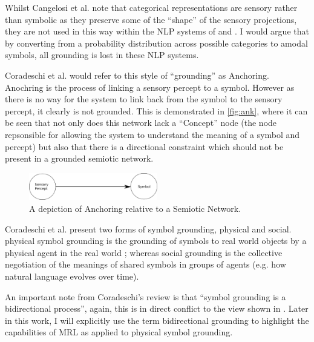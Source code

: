 Whilst Cangelosi et al. note that categorical representations are sensory rather than symbolic as they preserve some of the ``shape'' of the sensory projections, they are not used in this way within the \ac{NLP} systems of \cite{lemonlearning} and \cite{yu2017learning}. I would argue that by converting from a probability distribution across possible categories to amodal symbols, all grounding is lost in these \ac{NLP} systems.

Coradeschi et al. \cite{coradeschi2000anchoring, coradeschi2003introduction} would refer to this style of ``grounding'' as Anchoring. Anochring is the process of linking a sensory percept to a symbol. However as there is no way for the system to link back from the symbol to the sensory percept, it clearly is not grounded. This is demonstrated in \autoref{fig:ank}, where it can be seen that not only does this network lack a ``Concept'' node (the node repsonsible for allowing the system to understand the meaning of a symbol and percept) but also that there is a directional constraint which should not be present in a grounded semiotic network. 

\begin{figure}
\centering
\includegraphics[width=0.5\textwidth]{Figs/litReview/anchoring.png}
\caption{A depiction of Anchoring relative to a Semiotic Network.}
\label{fig:ank}

\end{figure}


Coradeschi et al. \cite{coradeschi2013short} present two forms of symbol grounding, physical and social. physical symbol grounding is the grounding of symbols to real world objects by a physical agent in the real world \cite{vogt2002physical}; whereas social grounding is the collective negotiation of the meanings of shared symbols in groups of agents \cite{cangelosi2006grounding} (e.g. how natural language evolves over time).

An important note from Coradeschi's review is that ``symbol grounding is a bidirectional process'', again, this is in direct conflict to the view shown in \cite{lemonlearning, yu2017learning}. Later in this work, I will explicitly use the term bidirectional grounding to highlight the capabilities of \ac{MRL} as applied to physical symbol grounding.

